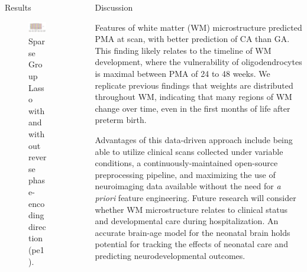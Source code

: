 \documentclass[final]{beamer}
\newlength{\sepwidth}
\newlength{\colwidth}
\newcommand{\separatorcolumn}{\begin{column}{\sepwidth}\end{column}}
\begin{document}
\begin{frame}[t]
\begin{columns}[t]
\begin{column}{\colwidth}
\begin{block}{Results}
    \vspace{-30pt}  %
    \begin{figure}
      \centering
      \includegraphics[trim=10 20 10 20,clip,width=1.05\textwidth]{sgl_both.jpg}
      \vspace{-40pt}  %
      \caption{Sparse Group Lasso with and without reverse phase-encoding direction (pe1).}
    \end{figure}

  \end{block}

\end{column}

\separatorcolumn

\begin{column}{\colwidth}

  \begin{block}{Discussion}

    Features of white matter (WM) microstructure predicted PMA at scan, with better prediction of CA than GA. This finding likely relates to the timeline of WM development, where the vulnerability of oligodendrocytes is maximal between PMA of 24 to 48 weeks. We replicate previous findings that weights are distributed throughout WM, indicating that many regions of WM change over time, even in the first months of life after preterm birth. 

    Advantages of this data-driven approach include being able to utilize clinical scans collected under variable conditions, a continuously-maintained open-source preprocessing pipeline, and maximizing the use of neuroimaging data available without the need for \textit{a priori} feature engineering. Future research will consider whether WM microstructure relates to clinical status and developmental care during hospitalization. An accurate brain-age model for the neonatal brain holds potential for tracking the effects of neonatal care and predicting neurodevelopmental outcomes.


\end{block}
\end{column}
\end{columns}
\end{frame}
\end{document}
